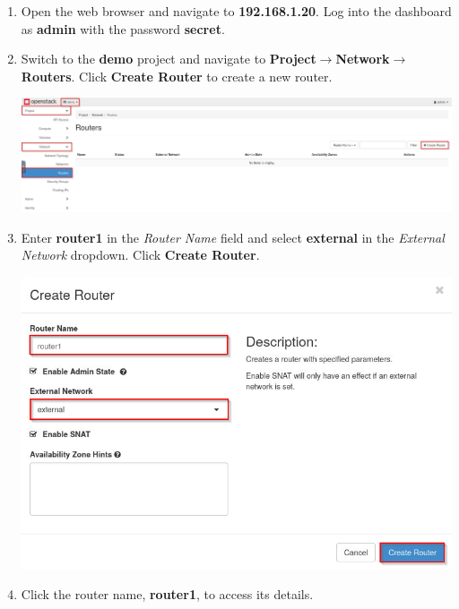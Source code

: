 \documentclass[letterpaper, 12pt]{article}
\begin{document}
\begin{enumerate}
    \item Open the web browser and navigate to \textbf{192.168.1.20}. Log into the dashboard as \textbf{admin} with the
    password \textbf{secret}.

    \item Switch to the \textbf{demo} project and navigate to \textbf{Project$\rightarrow$Network$\rightarrow$Routers}.
    Click \textbf{Create Router} to create a new router.
    
    \begin{center}
        \includegraphics[width=\linewidth]{images/part2/step2.png}
    \end{center}

    \item Enter \textbf{router1} in the \textit{Router Name} field and select \textbf{external} in the \textit{External
    Network} dropdown. Click \textbf{Create Router}.

    \begin{center}
        \includegraphics[width=\linewidth]{images/part2/step3.png}
    \end{center}

    \item Click the router name, \textbf{router1}, to access its details.
    

\end{enumerate}
\end{document}
